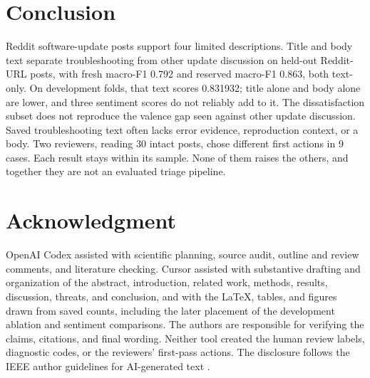 \documentclass[conference,letterpaper]{IEEEtran}
\begin{document}
\section{Conclusion}
Reddit software-update posts support four limited descriptions. Title and body text separate troubleshooting from other update discussion on held-out Reddit-URL posts, with fresh macro-F1 0.792 and reserved macro-F1 0.863, both text-only. On development folds, that text scores 0.831932; title alone and body alone are lower, and three sentiment scores do not reliably add to it. The dissatisfaction subset does not reproduce the valence gap seen against other update discussion. Saved troubleshooting text often lacks error evidence, reproduction context, or a body. Two reviewers, reading 30 intact posts, chose different first actions in 9 cases. Each result stays within its sample. None of them raises the others, and together they are not an evaluated triage pipeline.

\section*{Acknowledgment}
OpenAI Codex assisted with scientific planning, source audit, outline and review comments, and literature checking. Cursor assisted with substantive drafting and organization of the abstract, introduction, related work, methods, results, discussion, threats, and conclusion, and with the LaTeX, tables, and figures drawn from saved counts, including the later placement of the development ablation and sentiment comparisons. The authors are responsible for verifying the claims, citations, and final wording. Neither tool created the human review labels, diagnostic codes, or the reviewers' first-pass actions. The disclosure follows the IEEE author guidelines for AI-generated text \cite{IEEE2024AIText}.



\end{document}
